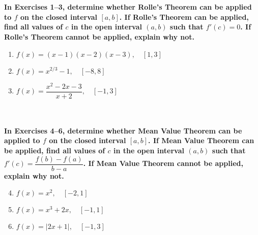 \begin{exercise}
    ~\\\\\-\hspace{0.3cm} \textbf{
        In Exercises 1–3, determine whether Rolle’s Theorem can be applied to $f$ on the closed interval $[a, b]$. If Rolle’s Theorem can be applied, find all values of $c$ in the open interval $(a, b)$ such that $f'(c)=0$. If Rolle’s Theorem cannot be applied, explain why not.
    }\cite{ci}\\
    \begin{enumerate} 
        \item $f(x)=(x-1)(x-2)(x-3), \quad [1,3]$
        \item $f(x)=x^{2/3}-1, \quad [-8,8]$
        \item $f(x)=\dfrac{x^2-2x-3}{x+2}, \quad [-1,3]$
    \end{enumerate}
    ~\\\\\-\hspace{0.3cm} \textbf{
        In Exercises 4–6, determine whether Mean Value Theorem can be applied to $f$ on the closed interval $[a, b]$. If Mean Value Theorem can be applied, find all values of $c$ in the open interval $(a, b)$ such that $f'(c)=\dfrac{f(b)-f(a)}{b-a}$. If Mean Value Theorem cannot be applied, explain why not.
    }\cite{ci}\\
    \begin{enumerate} 
        \setcounter{enumi}{3}
        \item $f(x)=x^2, \quad [-2,1]$
        \item $f(x)=x^3+2x, \quad [-1,1]$
        \item $f(x)=|2x+1|, \quad [-1,3]$
    \end{enumerate}
\end{exercise}
